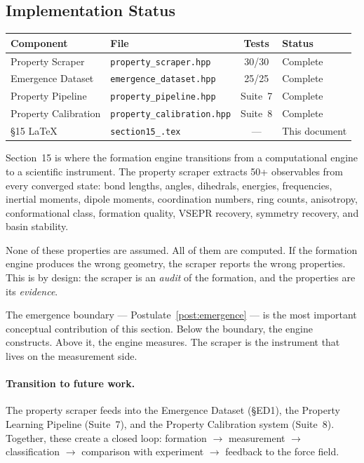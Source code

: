 \documentclass[11pt, a4paper, oneside]{article}
\theoremstyle{definition}
\theoremstyle{remark}
\begin{document}
\subsection{Implementation Status}
\label{sec:implementation-status}

\begin{center}
\begin{tabular}{llcl}
\toprule
Component & File & Tests & Status \\
\midrule
Property Scraper & \texttt{property\_scraper.hpp} & 30/30 & Complete \\
Emergence Dataset & \texttt{emergence\_dataset.hpp} & 25/25 & Complete \\
Property Pipeline & \texttt{property\_pipeline.hpp} & Suite~7 & Complete \\
Property Calibration & \texttt{property\_calibration.hpp} & Suite~8 & Complete \\
§15 LaTeX & \texttt{section15\_.tex} & — & This document \\
\bottomrule
\end{tabular}
\end{center}

Section~15 is where the formation engine transitions from a
computational engine to a scientific instrument.  The property scraper
extracts 50+ observables from every converged state: bond lengths,
angles, dihedrals, energies, frequencies, inertial moments, dipole
moments, coordination numbers, ring counts, anisotropy, conformational
class, formation quality, VSEPR recovery, symmetry recovery, and basin
stability.

None of these properties are assumed.  All of them are computed.  If
the formation engine produces the wrong geometry, the scraper reports
the wrong properties.  This is by design: the scraper is an
\textit{audit} of the formation, and the properties are its
\textit{evidence}.

The emergence boundary — Postulate~\ref{post:emergence} — is the most
important conceptual contribution of this section.  Below the boundary,
the engine constructs.  Above it, the engine measures.  The scraper is
the instrument that lives on the measurement side.

\paragraph{Transition to future work.}
The property scraper feeds into the Emergence Dataset (\S ED1), the
Property Learning Pipeline (Suite~7), and the Property Calibration
system (Suite~8).  Together, these create a closed loop: formation
$\to$ measurement $\to$ classification $\to$ comparison with experiment
$\to$ feedback to the force field.
\end{document}
